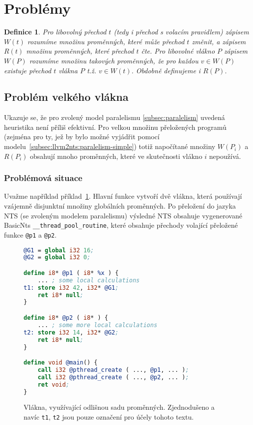 \documentclass[12pt]{fithesis2}
\newtheorem{definition}{Definice}
\begin{document}
\section{Problémy}

\begin{definition}
Pro libovolný přechod $t$ (tedy i přechod s volacím pravidlem) zápisem $W(t)$ rozumíme množinu proměnných, které může přechod $t$ změnit, a zápisem $R(t)$ množinu proměnných, které přechod $t$ čte. Pro libovolné vlákno $P$ zápisem $W(P)$ rozumíme množinu takových proměnných, že pro každou $v \in W(P)$ existuje přechod $t$ vlákna $P$ t.ž. $v \in W(t)$. Obdobně definujeme i $R(P)$.
\end{definition}

\subsection{Problém velkého vlákna}
Ukazuje se, že pro zvolený model paralelismu \ref{subsec:paralelism} uvedená heuristika není příliš efektivní. Pro velkou množinu přeložených programů (zejména pro ty, jež by bylo možné vyjádřit pomocí modelu~\ref{subsec:llvm2nts:paralelism-simple}) totiž napočítané množiny $W(P_i)$ a $R(P_i)$ obsahují mnoho proměnných, které ve skutečnosti vlákno $i$ nepoužívá.


\subsubsection{Problémová situace}
Uvažme například příklad~\ref{fig:problem-big-thread}. Hlavní funkce vytvoří dvě vlákna, která používají vzájemně disjunktní množiny globálních proměnných. Po přeložení do jazyka NTS (se zvoleným modelem paralelismu) výsledné NTS obsahuje vygenerované BasicNts \texttt{__thread_pool_routine}, které obsahuje přechody volající přeložené funkce \texttt{@p1} a \texttt{@p2}.
\begin{figure}[h!]
\begin{lstlisting}[language=llvm]
@G1 = global i32 16;
@G2 = global i32 0;

define i8* @p1 ( i8* %x ) {
	... ; some local calculations
t1:	store i32 42, i32* @G1;
	ret i8* null;
}

define i8* @p2 ( i8* ) {
	... ; some more local calculations
t2:	store i32 14, i32* @G2;
	ret i8* null;
}

define void @main() {
	call i32 @pthread_create ( ..., @p1, ... );
	call i32 @pthread_create ( ..., @p2, ... );
	ret void;
}
\end{lstlisting}
\caption{Vlákna, využívající odlišnou sadu proměnných. Zjednodušeno a navíc \texttt{t1}, \texttt{t2} jsou pouze označení pro účely tohoto textu.}
\label{fig:problem-big-thread}
\end{figure}
\end{document}
